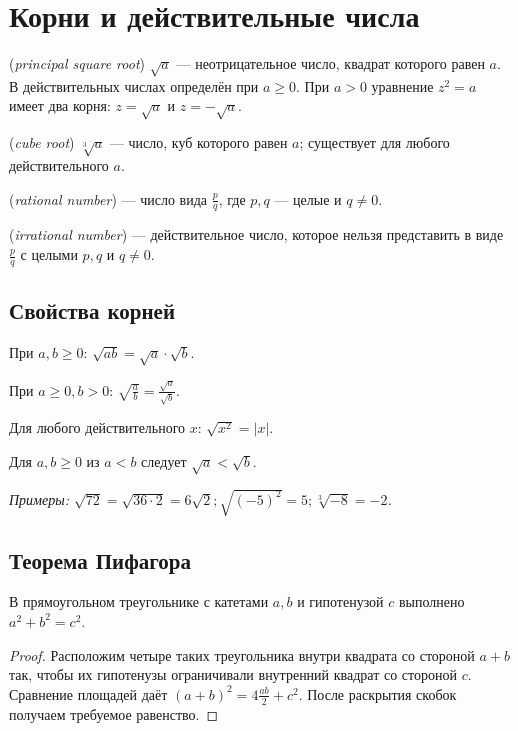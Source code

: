 \chapter{Корни и действительные числа}\label{chap:c07}
\begin{definition} (\emph{principal square root}) \(\sqrt{a}\) — неотрицательное число, квадрат которого равен \(a\). В действительных числах определён при \(a \ge  0\). При \(a>0\) уравнение \(z^2=a\) имеет два корня: \(z=\sqrt a\) и \(z=-\sqrt a\).\end{definition}
\begin{definition} (\emph{cube root}) \(\sqrt[3]{a}\) — число, куб которого равен \(a\); существует для любого действительного \(a\).\end{definition}
\begin{definition} (\emph{rational number}) — число вида \(\frac{p}{q}\), где \(p,\allowbreak q\) — целые и \(q \ne  0\).\end{definition}
\begin{definition} (\emph{irrational number}) — действительное число, которое нельзя представить в виде \(\frac{p}{q}\) с целыми \(p,q\) и \(q\ne0\).\end{definition}
\section{Свойства корней}
При \(a,\allowbreak b \ge 0\): \(\sqrt{ab} = \sqrt{a} \cdot \sqrt{b}\).\par
При \(a \ge 0,\allowbreak b > 0\): \(\sqrt{\frac{a}{b}} = \frac{\sqrt{a}}{\sqrt{b}}\).\par
Для любого действительного \(x\): \(\sqrt{x^{2}} = | x |\).\par
Для \(a,\allowbreak b \ge  0\) из \(a < b\) следует \(\sqrt{a} < \sqrt{b}\).\par
{\small\textit{Примеры: \(\sqrt{72} = \sqrt{36 \cdot  2} = 6 \sqrt{2};\allowbreak \sqrt{(- 5)^{2}} = 5;\allowbreak \sqrt[3]{- 8} = - 2\).}}\par
\section{Теорема Пифагора}
\begin{theorem}\label{thm:legacy-c07-1}
В прямоугольном треугольнике с катетами \(a,b\) и гипотенузой \(c\) выполнено \(a^2+b^2=c^2\).
\end{theorem}
\begin{proof}Расположим четыре таких треугольника внутри квадрата со стороной \(a+b\) так, чтобы их гипотенузы ограничивали внутренний квадрат со стороной \(c\). Сравнение площадей даёт \((a+b)^2=4\frac{ab}{2}+c^2\). После раскрытия скобок получаем требуемое равенство.\end{proof}
